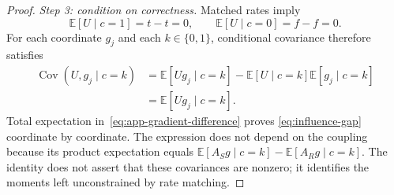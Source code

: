 \begin{proof}
\textit{Step 3: condition on correctness.}
Matched rates imply
\[
 \mathbb E[U\mid c=1]=t-t=0,\qquad
 \mathbb E[U\mid c=0]=f-f=0.
\]
For each coordinate $g_j$ and each $k\in\{0,1\}$, conditional covariance
therefore satisfies
\begin{align*}
 \operatorname{Cov}(U,g_j\mid c=k)
 &=\mathbb E[Ug_j\mid c=k]
   -\mathbb E[U\mid c=k]\mathbb E[g_j\mid c=k]\\
 &=\mathbb E[Ug_j\mid c=k].
\end{align*}
Total expectation in~\eqref{eq:app-gradient-difference} proves
\eqref{eq:influence-gap} coordinate by coordinate. The expression does not
depend on the coupling because its product expectation equals
$\mathbb E[A_Sg\mid c=k]-\mathbb E[A_Rg\mid c=k]$. The identity does not
assert that these covariances are nonzero; it identifies the moments left
unconstrained by rate matching.
\end{proof}

